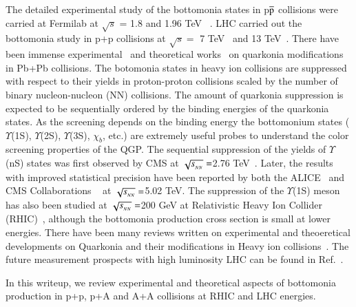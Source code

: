 The detailed experimental study of the bottomonia states in p$\overline{\rm p}$ collisions 
were carried at Fermilab at $\surd s$ = 1.8 and 1.96 TeV ~\cite{CDF:1995gwi,CDF:2001fdy,D0:2005klj}.
LHC carried out the bottomonia study in p+p collisions at
$\surd s=$ 7 TeV~\cite{CMS:2010wld,CMS:2015xqv,ATLAS:2012lmu} and
13 TeV~\cite{CMS:2017dju,LHCb:2018yzj}.
There have been immense
experimental~\cite{Sirunyan:2017isk,Sirunyan:2017lzi,CMS:2018zza,Acharya:2019iur,ALICE:2018wzm}
and theoretical works~\cite{Strickland:2011mw,Song:2011nu,Kumar:2014kfa,Kumar:2019xdj} on
quarkonia modifications in Pb+Pb collisions.
The botomonia states in heavy ion collisions are suppressed with respect to their yields
in proton-proton collisions scaled by the number of binary nucleon-nucleon
(NN) collisions.
The amount of quarkonia suppression is expected to be sequentially ordered by the binding
energies of the quarkonia states.
 As the screening depends on the  binding energy the bottomonium states ($\Upsilon$(1S), $\Upsilon$(2S),
$\Upsilon$(3S), $\chi_{b}$, etc.) are extremely useful probes to understand the color screening
properties of the QGP.
The sequential suppression of the yields of $\Upsilon$(nS) states was first observed by
CMS at $\sqrt{s_{_{NN}}} =$2.76 TeV~\cite{Chatrchyan:2011pe,Chatrchyan:2012lxa}. Later, the results with
improved statistical precision have been reported by both the ALICE~\cite{ALICE:2018wzm}
and CMS Collaborations ~\cite{Sirunyan:2017lzi,CMS:2018zza} at $\sqrt{s_{_{NN}}} =$5.02 TeV.
The suppression of the $\Upsilon$(1S)
meson has also been studied at $\sqrt{s_{_{NN}}} =$200 GeV at Relativistic Heavy Ion Collider
(RHIC)~\cite{STAR:2013kwk}, although the 
bottomonia production cross section is small at lower energies.
There have been many reviews written on experimental and theoeretical developments on Quarkonia and
their modifications in Heavy ion collisions~\cite{Brambilla:2010cs,Andronic:2015wma,Rothkopf:2019ipj}.
The future measurement prospects with high luminosity LHC can be found in Ref.~\cite{Chapon:2020heu}.

In this writeup, we review experimental and theoretical aspects of bottomonia production in p+p, p+A
and A+A collisions at RHIC and LHC energies.







